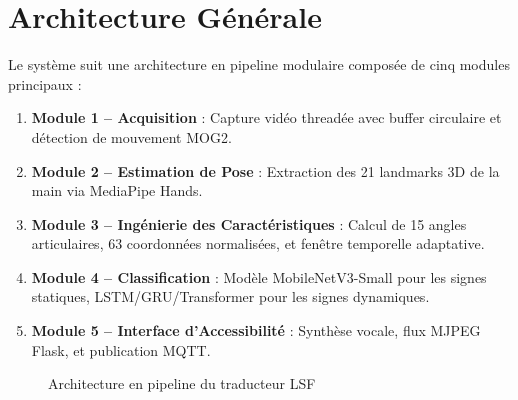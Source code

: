 \section{Architecture Générale}

Le système suit une architecture en pipeline modulaire composée de cinq modules principaux :

\begin{enumerate}
    \item \textbf{Module 1 -- Acquisition} : Capture vidéo threadée avec buffer circulaire et détection de mouvement MOG2.
    \item \textbf{Module 2 -- Estimation de Pose} : Extraction des 21 landmarks 3D de la main via MediaPipe Hands.
    \item \textbf{Module 3 -- Ingénierie des Caractéristiques} : Calcul de 15 angles articulaires, 63 coordonnées normalisées, et fenêtre temporelle adaptative.
    \item \textbf{Module 4 -- Classification} : Modèle MobileNetV3-Small pour les signes statiques, LSTM/GRU/Transformer pour les signes dynamiques.
    \item \textbf{Module 5 -- Interface d'Accessibilité} : Synthèse vocale, flux MJPEG Flask, et publication MQTT.
\end{enumerate}

\begin{figure}[H]
    \centering
    \caption{Architecture en pipeline du traducteur LSF}
\end{figure}

